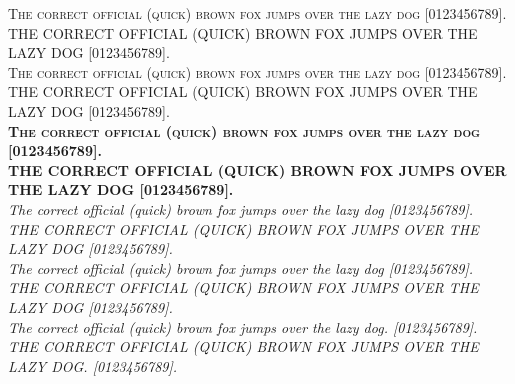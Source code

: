 \documentclass{PalisadesLakesArticle}
\begin{document}
\textsc{%
The correct official (quick) brown fox jumps over the lazy dog [0123456789].\\
THE CORRECT OFFICIAL (QUICK) BROWN FOX JUMPS OVER THE LAZY DOG [0123456789].\\ }
\textsc{\textmd{%
The correct official (quick) brown fox jumps over the lazy dog [0123456789].\\
THE CORRECT OFFICIAL (QUICK) BROWN FOX JUMPS OVER THE LAZY DOG [0123456789].\\ }}
\textsc{}
\textsc{\textbf{%
The correct official (quick) brown fox jumps over the lazy dog [0123456789].\\
THE CORRECT OFFICIAL (QUICK) BROWN FOX JUMPS OVER THE LAZY DOG [0123456789].\\ }}
\textsc{}
\newpage
\textit{%
The correct official (quick) brown fox jumps over the lazy dog [0123456789].\\
THE CORRECT OFFICIAL (QUICK) BROWN FOX JUMPS OVER THE LAZY DOG [0123456789].\\ }
\textit{}
\textit{}
\textit{%
The correct official (quick) brown fox jumps over the lazy dog [0123456789].\\
THE CORRECT OFFICIAL (QUICK) BROWN FOX JUMPS OVER THE LAZY DOG [0123456789].\\ }
\textit{\textmd{%
The correct official (quick) brown fox jumps over the lazy dog. [0123456789].\\
THE CORRECT OFFICIAL (QUICK) BROWN FOX JUMPS OVER THE LAZY DOG. [0123456789].\\ }}
\textit{}
\end{document}
